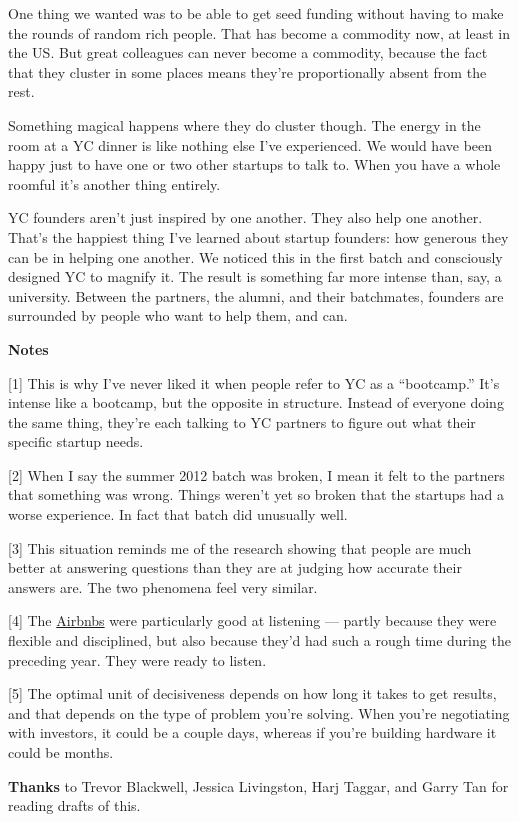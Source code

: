 One thing we wanted was to be able to get seed funding without having to
make the rounds of random rich people. That has become a commodity now,
at least in the US. But great colleagues can never become a commodity,
because the fact that they cluster in some places means they're
proportionally absent from the rest.

Something magical happens where they do cluster though. The energy in
the room at a YC dinner is like nothing else I've experienced. We would
have been happy just to have one or two other startups to talk to. When
you have a whole roomful it's another thing entirely.

YC founders aren't just inspired by one another. They also help one
another. That's the happiest thing I've learned about startup founders:
how generous they can be in helping one another. We noticed this in the
first batch and consciously designed YC to magnify it. The result is
something far more intense than, say, a university. Between the
partners, the alumni, and their batchmates, founders are surrounded by
people who want to help them, and can.

\textbf{Notes}

{[}1{]} This is why I've never liked it when people refer to YC as a
``bootcamp.'' It's intense like a bootcamp, but the opposite in
structure. Instead of everyone doing the same thing, they're each
talking to YC partners to figure out what their specific startup needs.

{[}2{]} When I say the summer 2012 batch was broken, I mean it felt to
the partners that something was wrong. Things weren't yet so broken that
the startups had a worse experience. In fact that batch did unusually
well.

{[}3{]} This situation reminds me of the research showing that people
are much better at answering questions than they are at judging how
accurate their answers are. The two phenomena feel very similar.

{[}4{]} The \href{airbnbs.html}{Airbnbs} were particularly good at
listening --- partly because they were flexible and disciplined, but
also because they'd had such a rough time during the preceding year.
They were ready to listen.

{[}5{]} The optimal unit of decisiveness depends on how long it takes to
get results, and that depends on the type of problem you're solving.
When you're negotiating with investors, it could be a couple days,
whereas if you're building hardware it could be months.

\textbf{Thanks} to Trevor Blackwell, Jessica Livingston, Harj Taggar,
and Garry Tan for reading drafts of this.
